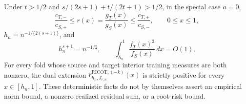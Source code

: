 Under \(t>1/2\) and \(s/(2s+1)+t/(2t+1)>1/2\), in the special case \(a=0\),
\[
\frac{c_{T,-}}{c_{S,+}}\le r(x)=\frac{g_T(x)}{g_S(x)}\le\frac{c_{T,+}}{c_{S,-}},\qquad 0\le x\le1,
\]
\(h_n=n^{-1/\{2(s+1)\}}\), and
\[
h_n^{s+1}=n^{-1/2},\qquad \int_{h_n}^1\frac{f_T(x)^2}{f_S(x)}\,dx=O(1).
\]
For every fold whose source and target interior training measures are both nonzero, the dual extension \(\widehat r^{\mathrm{RICOT},(-k)}_{h_n,J_{r,n}}(x)\) is strictly positive for every \(x\in[h_n,1]\). These deterministic facts do not by themselves assert an empirical norm bound, a nonzero realized residual sum, or a root-risk bound.